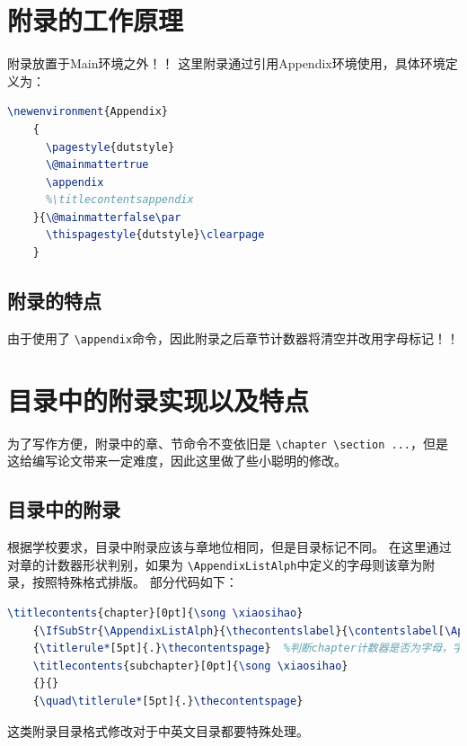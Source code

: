 \documentclass[master]{dutthesis} %
\begin{document}
\begin{Main} %




\end{Main} %
\begin{Appendix}
    \chapter{附录的工作原理}
    附录放置于Main环境之外！！
    这里附录通过引用Appendix环境使用，具体环境定义为：
    \begin{lstlisting}[language=TeX]
	\newenvironment{Appendix}
	{
	  \pagestyle{dutstyle}
	  \@mainmattertrue
	  \appendix
	  %\titlecontentsappendix
	}{\@mainmatterfalse\par
	  \thispagestyle{dutstyle}\clearpage
	}
    \end{lstlisting}


    \section{附录的特点}
    由于使用了 \lstinline|\appendix|命令，因此附录之后章节计数器将清空并改用字母标记！！ 
    \chapter{目录中的附录实现以及特点}
    为了写作方便，附录中的章、节命令不变依旧是 \lstinline|\chapter \section ...|，但是这给编写论文带来一定难度，因此这里做了些小聪明的修改。
    \section{目录中的附录}
    根据学校要求，目录中附录应该与章地位相同，但是目录标记不同。
    在这里通过对章的计数器形状判别，如果为 \lstinline|\AppendixListAlph|中定义的字母则该章为附录，按照特殊格式排版。 
    部分代码如下：
    \begin{lstlisting}[language=TeX]
	\titlecontents{chapter}[0pt]{\song \xiaosihao}
	{\IfSubStr{\AppendixListAlph}{\thecontentslabel}{\contentslabel[\AppendixTOCName~\thecontentslabel]{0mm}\phantom{\AppendixTOCName~\thecontentslabel}\quad}{\thecontentslabel\quad}}{}
	{\titlerule*[5pt]{.}\thecontentspage}  %判断chapter计数器是否为字母，字母则为附录
	\titlecontents{subchapter}[0pt]{\song \xiaosihao}
	{}{}
	{\quad\titlerule*[5pt]{.}\thecontentspage}
    \end{lstlisting}
    这类附录目录格式修改对于中英文目录都要特殊处理。


\end{Appendix}
\end{document}
